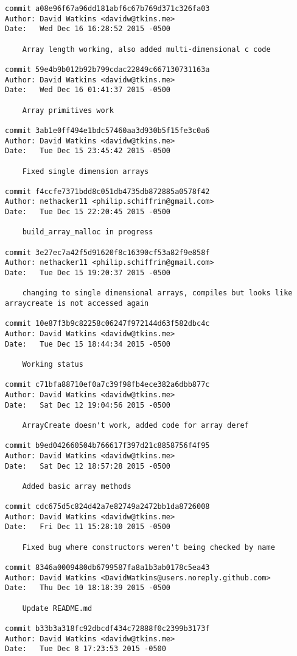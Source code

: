 \begin{verbatim}
commit a08e96f67a96dd181abf6c67b769d371c326fa03
Author: David Watkins <davidw@tkins.me>
Date:   Wed Dec 16 16:28:52 2015 -0500

    Array length working, also added multi-dimensional c code

commit 59e4b9b012b92b799cdac22849c667130731163a
Author: David Watkins <davidw@tkins.me>
Date:   Wed Dec 16 01:41:37 2015 -0500

    Array primitives work

commit 3ab1e0ff494e1bdc57460aa3d930b5f15fe3c0a6
Author: David Watkins <davidw@tkins.me>
Date:   Tue Dec 15 23:45:42 2015 -0500

    Fixed single dimension arrays

commit f4ccfe7371bdd8c051db4735db872885a0578f42
Author: nethacker11 <philip.schiffrin@gmail.com>
Date:   Tue Dec 15 22:20:45 2015 -0500

    build_array_malloc in progress

commit 3e27ec7a42f5d91620f8c16390cf53a82f9e858f
Author: nethacker11 <philip.schiffrin@gmail.com>
Date:   Tue Dec 15 19:20:37 2015 -0500

    changing to single dimensional arrays, compiles but looks like arraycreate is not accessed again

commit 10e87f3b9c82258c06247f972144d63f582dbc4c
Author: David Watkins <davidw@tkins.me>
Date:   Tue Dec 15 18:44:34 2015 -0500

    Working status

commit c71bfa88710ef0a7c39f98fb4ece382a6dbb877c
Author: David Watkins <davidw@tkins.me>
Date:   Sat Dec 12 19:04:56 2015 -0500

    ArrayCreate doesn't work, added code for array deref

commit b9ed042660504b766617f397d21c8858756f4f95
Author: David Watkins <davidw@tkins.me>
Date:   Sat Dec 12 18:57:28 2015 -0500

    Added basic array methods

commit cdc675d5c824d42a7e82749a2472bb1da8726008
Author: David Watkins <davidw@tkins.me>
Date:   Fri Dec 11 15:28:10 2015 -0500

    Fixed bug where constructors weren't being checked by name

commit 8346a0009480db6799587fa8a1b3ab0178c5ea43
Author: David Watkins <DavidWatkins@users.noreply.github.com>
Date:   Thu Dec 10 18:18:39 2015 -0500

    Update README.md

commit b33b3a318fc92dbcdf434c72888f0c2399b3173f
Author: David Watkins <davidw@tkins.me>
Date:   Tue Dec 8 17:23:53 2015 -0500


\end{verbatim}
